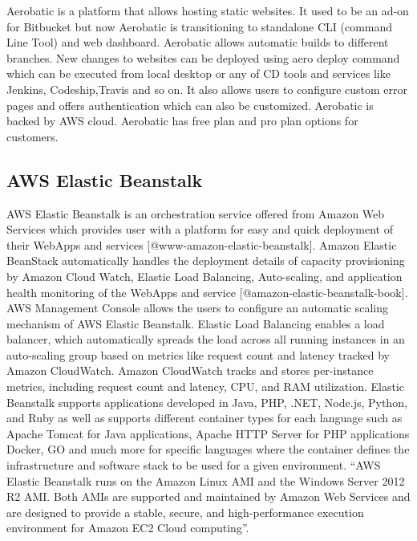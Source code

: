 Aerobatic is a platform that allows hosting static
websites\cite{www-aero}. It used to be an ad-on for Bitbucket but now
Aerobatic is transitioning to standalone CLI (command Line Tool) and
web dashboard. Aerobatic allows automatic builds to different
branches. New changes to websites can be deployed using aero deploy
command which can be executed from local desktop or any of CD tools
and services like Jenkins, Codeship,Travis and so on.  It also allows
users to configure custom error pages and offers authentication which
can also be customized. Aerobatic is backed by AWS cloud. Aerobatic
has free plan and pro plan options for customers.



\subsection{AWS Elastic Beanstalk}

AWS Elastic Beanstalk is an orchestration service offered from Amazon
Web Services which provides user with a platform for easy and quick
deployment of their WebApps and
services [@www-amazon-elastic-beanstalk]. Amazon Elastic BeanStack
automatically handles the deployment details of capacity provisioning
by Amazon Cloud Watch, Elastic Load Balancing, Auto-scaling, and
application health monitoring of the WebApps and
service [@amazon-elastic-beanstalk-book]. AWS Management Console
allows the users to configure an automatic scaling mechanism of AWS
Elastic Beanstalk. Elastic Load Balancing enables a load balancer,
which automatically spreads the load across all running instances in
an auto-scaling group based on metrics like request count and latency
tracked by Amazon CloudWatch. Amazon CloudWatch tracks and stores
per-instance metrics, including request count and latency, CPU, and
RAM utilization. Elastic Beanstalk supports applications developed in
Java, PHP, .NET, Node.js, Python, and Ruby as well as supports
different container types for each language such as Apache Tomcat for
Java applications, Apache HTTP Server for PHP applications Docker, GO
and much more for specific languages where the container defines the
infrastructure and software stack to be used for a given
environment. ``AWS Elastic Beanstalk runs on the Amazon Linux AMI and
the Windows Server 2012 R2 AMI. Both AMIs are supported and maintained
by Amazon Web Services and are designed to provide a stable, secure,
and high-performance execution environment for Amazon EC2 Cloud
computing''\cite{www-amazon-elastic-beanstalk}.

